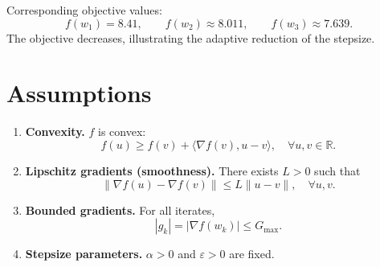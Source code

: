 \documentclass{article}
\begin{document}
Corresponding objective values:
\[
f(w_1)=8.41,\qquad f(w_2)\approx8.011,\qquad f(w_3)\approx7.639.
\]
The objective decreases, illustrating the adaptive reduction of the stepsize.

\section*{Assumptions}
\begin{enumerate}
\item \textbf{Convexity.} $f$ is convex:
\[
f(u)\ge f(v)+\langle \nabla f(v),u-v\rangle,\quad\forall u,v\in\mathbb{R}.
\tag{A1}
\]
\item \textbf{Lipschitz gradients (smoothness).} There exists $L>0$ such that
\[
\|\nabla f(u)-\nabla f(v)\|\le L\|u-v\|,\quad\forall u,v.
\tag{A2}
\]
\item \textbf{Bounded gradients.} For all iterates,
\[
|g_k|=|\nabla f(w_k)|\le G_{\max }.
\tag{A3}
\]
\item \textbf{Stepsize parameters.} $\alpha>0$ and $\varepsilon>0$ are fixed.
\end{enumerate}

\end{document}
